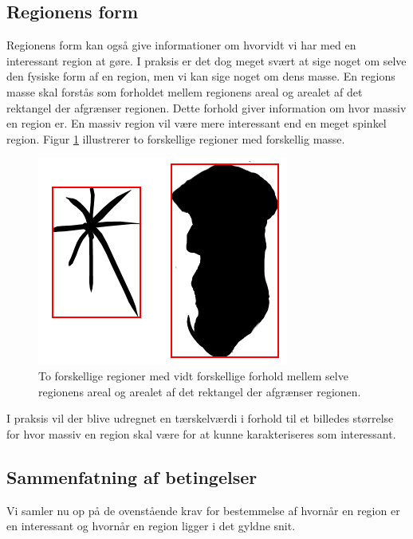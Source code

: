 {\subsection{Regionens form}
Regionens form kan også give informationer om hvorvidt vi har med en
interessant region at gøre.  I praksis er det dog meget svært at sige
noget om selve den fysiske form af en region, men vi kan sige noget om
dens masse.  En regions masse skal forstås som forholdet mellem
regionens areal og arealet af det rektangel der afgrænser regionen.
Dette forhold giver information om hvor massiv en region er.  En massiv
region vil være mere interessant end en meget spinkel region.  Figur
\ref{region_mass} illustrerer to forskellige regioner med forskellig
masse.
\begin{figure}[h]
    \begin{center}
        \includegraphics[scale=\imgscale,angle=0]{afsnit/vores_implementation/billeder/naiv_algoritme/bbox_area_ratio}
    \end{center}
    \caption[Regioners masse]{To forskellige regioner med vidt forskellige forhold
    mellem selve regionens areal og arealet af det rektangel der
    afgrænser regionen.}
    \label{region_mass}
\end{figure}
I praksis vil der blive udregnet en tærskelværdi i forhold til et
billedes størrelse for hvor massiv en region skal være for at kunne
karakteriseres som interessant.

\subsection{Sammenfatning af betingelser}
Vi samler nu op på de ovenstående krav for bestemmelse af hvornår en
region er en interessant og hvornår en region ligger i det
gyldne snit.

}

